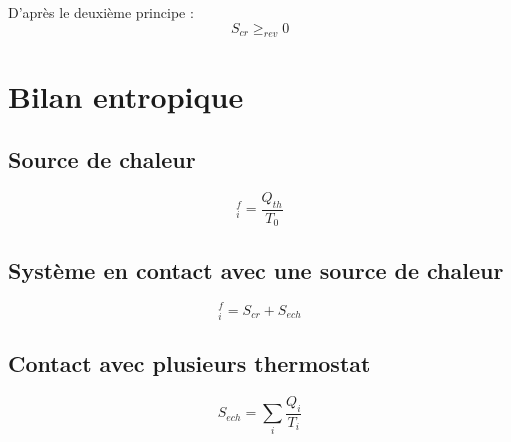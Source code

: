 D'après le deuxième principe : 
\begin{equation}
  S _{cr} \ge _{rev} 0
\end{equation}


\section{Bilan entropique} %
\label{sec:Bilan entropique}

\subsection{Source de chaleur} %
\label{sub:Source de chaleur}

\begin{equation}
  [S _{th}] _i ^{f} = \frac{Q _{th}}{T_0} 
\end{equation} 

\subsection{Système en contact avec une source de chaleur} %
\label{sub:Système en contact avec une source de chaleur}

\begin{equation}
  [S] _{i} ^{f} = S _{cr} + S _{ech}
\end{equation}

\subsection{Contact avec plusieurs thermostat} %
\label{sub:Contact avec plusieurs thermostat}

\begin{equation}
  S _{ech} = \sum_{i}^{} \frac{Q_i}{T_i} 
\end{equation}


